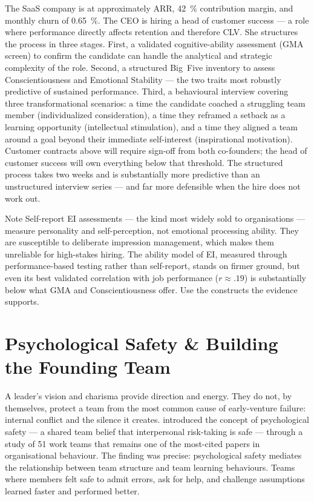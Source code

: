 \begin{example}
The SaaS company is at approximately  ARR, \qty{42}{\percent} contribution
margin, and monthly churn of \qty{0.65}{\percent}. The CEO is hiring a head of customer success
--- a role where performance directly affects retention and therefore CLV. She structures the
process in three stages. First, a validated cognitive-ability assessment (GMA screen) to confirm
the candidate can handle the analytical and strategic complexity of the role. Second, a
structured Big~Five inventory to assess Conscientiousness and Emotional Stability --- the two
traits most robustly predictive of sustained performance. Third, a behavioural interview
covering three transformational scenarios: a time the candidate coached a struggling team member
(individualized consideration), a time they reframed a setback as a learning opportunity
(intellectual stimulation), and a time they aligned a team around a goal beyond their immediate
self-interest (inspirational motivation). Customer contracts above  will require
sign-off from both co-founders; the head of customer success will own everything below that
threshold. The structured process takes two weeks and is substantially more predictive than an
unstructured interview series --- and far more defensible when the hire does not work out.
\end{example}

\begin{admonition}{Note}
Self-report EI assessments --- the kind most widely sold to organisations --- measure personality
and self-perception, not emotional processing ability. They are susceptible to deliberate
impression management, which makes them unreliable for high-stakes hiring. The ability model of
EI, measured through performance-based testing rather than self-report, stands on firmer ground,
but even its best validated correlation with job performance (\(r \approx .19\)) is substantially
below what GMA and Conscientiousness offer. Use the constructs the evidence supports.
\end{admonition}

\section{Psychological Safety \& Building the Founding Team}\label{sec:psych-safety-team}

A leader's vision and charisma provide direction and energy. They do not, by themselves, protect
a team from the most common cause of early-venture failure: internal conflict and the silence it
creates. \textcite{edmondson1999psychological} introduced the concept of psychological safety ---
a shared team belief that interpersonal risk-taking is safe --- through a study of 51 work teams
that remains one of the most-cited papers in organisational behaviour. The finding was precise:
psychological safety mediates the relationship between team structure and team learning
behaviours. Teams where members felt safe to admit errors, ask for help, and challenge
assumptions learned faster and performed better.

